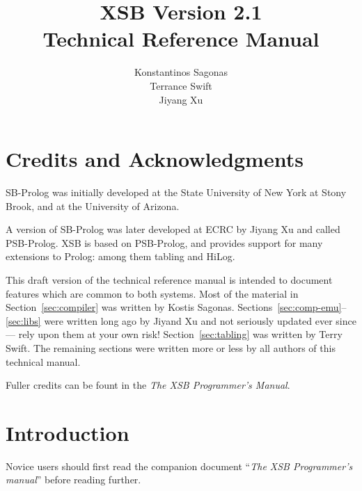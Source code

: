 \documentclass[11pt]{article}
\newcommand{\version}{Version 2.1}
\begin{document}
\thispagestyle{empty}
\title
          {XSB \version \\ Technical Reference Manual}

\author{     Konstantinos Sagonas \\ Terrance Swift \\ Jiyang Xu
}
\maketitle

\newpage

\section*{	 	Credits	and Acknowledgments		 }

SB-Prolog was initially developed at the State University of New York
at Stony Brook, and at the University of Arizona.

A version of SB-Prolog was later developed at ECRC by Jiyang Xu and
called PSB-Prolog.  XSB is based on PSB-Prolog, and provides support
for many extensions to Prolog: among them tabling and HiLog.

This draft version of the technical reference manual is intended to
document features which are common to both systems.  Most of the
material in Section~\ref{sec:compiler} was written by Kostis Sagonas.
Sections~\ref{sec:comp-emu}--\ref{sec:libs} were written long ago by
Jiyand Xu and not seriously updated ever since --- rely upon them at
your own risk!  Section~\ref{sec:tabling} was written by Terry Swift.
The remaining sections were written more or less by all authors of
this technical manual.

Fuller credits can be fount in the {\it The XSB Programmer's Manual}.
\newpage

\tableofcontents

\newpage

\listoftables

\newpage

\listoffigures

\newpage

\section                 {Introduction}


Novice users should first read the companion document ``{\it The XSB
Programmer's manual}'' before reading further.
\end{document}
